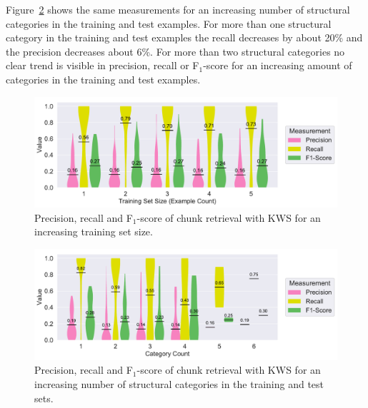 Figure~\ref{fig:recall-precision-categorycount-KWS} shows the same measurements for an increasing number of structural categories in the training and test examples.
For more than one structural category in the training and test examples the recall decreases by about 20\% and the precision decreases about 6\%.
For more than two structural categories no clear trend is visible in precision, recall or F$_{1}$-score for an increasing amount of categories in the training and test examples.


\begin{figure}[!t]
		\centering
		\includegraphics[width=\columnwidth, clip]{img/big-study/recall-precision-examplecount-KWS.pdf}
		\caption{Precision, recall and F$_{1}$-score of chunk retrieval with KWS for an increasing training set size.}
		\label{fig:recall-precision-examplecount-KWS}
\end{figure}

\begin{figure}[!t]
		\centering
		\includegraphics[width=\columnwidth, clip]{img/big-study/recall-precision-categorycount-KWS.pdf}
		\caption{Precision, recall and F$_{1}$-score of chunk retrieval with KWS for an increasing number of structural categories in the training and test sets.}
		\label{fig:recall-precision-categorycount-KWS}
\end{figure}

